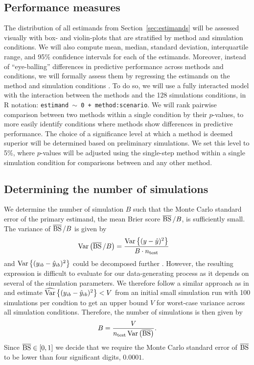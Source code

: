 \subsection{Performance measures} \label{sec:performance}

The distribution of all estimands from Section~\ref{sec:estimands} will be
assessed visually with box- and violin-plots that are stratified by method and
simulation conditions. We will also compute mean, median, standard deviation,
interquartile range, and 95\% confidence intervals for each of the estimands.
Moreover, instead of ``eye-balling'' differences in predictive performance
across methods and conditions, we will formally assess them by regressing the
estimands on the method and simulation conditions \citep[\cf][]{Skrondal2000}.
To do so, we will use a fully interacted model with the interaction between the
methods and the 128 simulations conditions, \ie in R notation: \texttt{estimand
  $\sim$ 0 + method:scenario}. We will rank pairwise comparison between two
methods within a single condition by their $p$-values, to more easily identify
conditions where methods show differences in predictive performance. The choice
of a significance level at which a method is deemed superior will be determined
based on preliminary simulations. We set this level to 5\%, where $p$-values
will be adjusted using the single-step method \citep{pkg:multcomp} within a
single simulation condition for comparisons between \ainet{} and any other
method.


\subsection{Determining the number of simulations}

We determine the number of simulation $B$ such that the Monte Carlo standard
error of the primary estimand, the mean Brier score $\operatorname{\overline{BS}}/B$, is sufficiently
small. The variance of $\operatorname{\overline{BS}}/B$ is given by
\begin{align*}
  \operatorname{Var}\left(\operatorname{\overline{BS}}/B\right)
  &= \frac{\operatorname{Var}\left\{(y -
    \hat{y})^{2}\right\}}{B \cdot n_{\text{test}}}
\end{align*}
and $\operatorname{Var}\left\{(y_{ib} - \hat{y}_{ib})^{2}\right\}$ could be decomposed further
\citep{Bradley2008}. However, the resulting expression is difficult to evaluate
for our data-generating process as it depends on several of the simulation
parameters. We therefore follow a similar approach as in \citet{Morris2019} and
estimate $\widehat{\operatorname{Var}}\left\{(y_{ib} - \hat{y}_{ib})^{2}\right\} < V$ from an
initial small simulation run with 100 simulations per condtion to get an upper
bound $V$ for worst-case variance across all simulation conditions. Therefore,
the number of simulations is then given by
$$B = \frac{V}{n_{\text{test}} \operatorname{Var}\left(\operatorname{\overline{BS}}\right)}.$$
Since $\operatorname{\overline{BS}} \in [0, 1]$ we decide that we require the Monte Carlo standard error
of $\operatorname{\overline{BS}}$ to be lower than four significant digits, $0.0001$.

